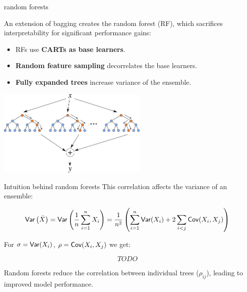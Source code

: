 \documentclass[11pt,compress,t,notes=noshow, xcolor=table]{beamer}
\begin{document}
\begin{vbframe}{random forests }

An extension of bagging creates the random forest (RF), which sacrifices interpretability for significant performance gains:

\begin{itemize}
\item RFs use \textbf{CARTs as base learners}. %
\item \textbf{Random feature sampling} decorrelates the base learners.
\item \textbf{Fully expanded trees} increase variance of the ensemble.
\end{itemize}

\begin{center}
\includegraphics[width=0.55\textwidth]{figure_man/forest.png}
\end{center}

\end{vbframe}


\begin{vbframe}{Intuition behind random forests}
This correlation affects the variance of an ensemble:

$$
\mathsf{Var}\left(\bar{X}\right) = \mathsf{Var}\left(\frac{1}{n} \sum_{i=1}^{n} X_i \right) = \frac{1}{n^2} \left( \sum_{i=1}^{n} \mathsf{Var}(X_i) + 2 \sum_{i < j} \mathsf{Cov}(X_i, X_j) \right)
$$

For $\sigma = \mathsf{Var}(X_i)$, $\rho = \mathsf{Cov}(X_i, X_j)$ we get:

$$
TODO
$$

Random forests reduce the correlation between individual trees (\(\rho_{ij}\)), leading to improved model performance.
\end{vbframe}
\end{document}
